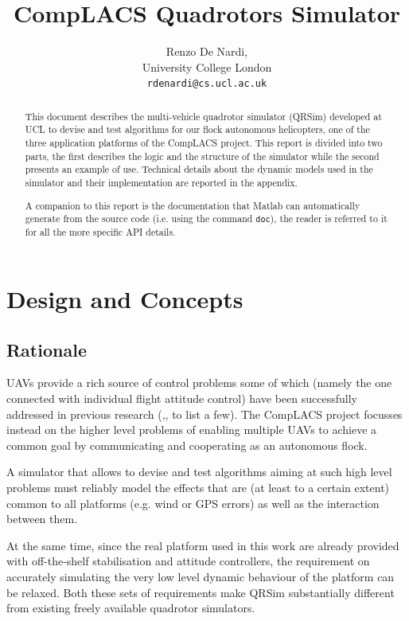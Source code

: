 \documentclass[a4paper,11pt]{report}
\title{{CompLACS} Quadrotors Simulator}
\author{Renzo De Nardi,\\University College London\\\texttt{rdenardi@cs.ucl.ac.uk}}
\newcommand{\sname}{QRSim\xspace}
\begin{document}
\maketitle

\begin{abstract}
This document describes the multi-vehicle quadrotor simulator (\sname) developed at UCL to devise and test algorithms for our flock autonomous helicopters, one of the three application platforms of the {CompLACS} project.
This report is divided into two parts, the first describes the logic and the structure of the simulator while the second presents an example of use. 
Technical details about the dynamic models used in the simulator and their implementation are reported in the appendix. 

A companion to this report is the documentation that Matlab can automatically generate from the source code (i.e. using the command \texttt{doc}), the reader is referred to it for all the more specific API details.
\end{abstract}

\tableofcontents

\chapter{Design and Concepts}

\section{Rationale}\label{sec:rationale}
UAVs provide a rich source of control problems some of which (namely the one connected with individual flight attitude control) have been successfully addressed in previous research (\cite{hoffman08quadrotor},\cite{shim03aflight},\cite{bouabdallah07phd} to list a few). The {CompLACS} project focusses instead on the higher level problems of enabling multiple UAVs to achieve a common goal by communicating and cooperating as an autonomous flock. 

A simulator that allows to devise and test algorithms aiming at such high level problems must reliably model the effects that are (at least to a certain extent) common to all platforms (e.g. wind or GPS errors) as well as the interaction between them.
 
At the same time, since the real platform used in this work are already provided with off-the-shelf stabilisation and attitude controllers, the requirement on accurately simulating the very low level dynamic behaviour of the platform can be relaxed.
Both these sets of requirements make \sname substantially different from existing freely available quadrotor simulators. 
\end{document}

